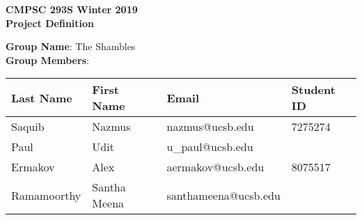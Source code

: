 \documentclass[12pt]{article}
\begin{document}
\begin{center}
\bfseries
\LARGE
CMPSC 293S Winter 2019\\
Project Definition\\[2em]
\end{center}

\noindent
\textbf{Group Name}: The Shambles\\
\noindent
\textbf{Group Members}:
\begin{table}[h]
\centering
\begin{tabular}{|l|l|l|l|}
\hline
\textbf{Last Name} & \textbf{First Name} & \textbf{Email} & \textbf{Student ID}\\
\hline
Saquib & Nazmus & nazmus@ucsb.edu & 7275274\\
\hline
Paul & Udit & u\_paul@ucsb.edu & ~\\
\hline
Ermakov & Alex & aermakov@ucsb.edu & 8075517\\
\hline
Ramamoorthy & Santha Meena & santhameena@ucsb.edu & ~\\
\hline
\end{tabular}
\end{table}
\end{document}

